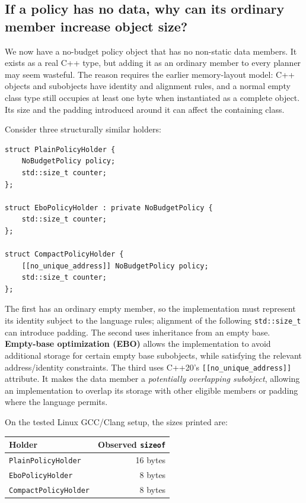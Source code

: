 \subsection{If a policy has no data, why can its ordinary member increase object size?}\label{01-foundations-i-ch005-if-a-policy-has-no-data-why-can-its-ordinary-member-increase-object-size}

We now have a no-budget policy object that has no non-static data members. It exists as a real C++ type, but adding it as an ordinary member to every planner may seem wasteful. The reason requires the earlier memory-layout model: C++ objects and subobjects have identity and alignment rules, and a normal empty class type still occupies at least one byte when instantiated as a complete object. Its size and the padding introduced around it can affect the containing class.

Consider three structurally similar holders:

\begin{verbatim}
struct PlainPolicyHolder {
    NoBudgetPolicy policy;
    std::size_t counter;
};

struct EboPolicyHolder : private NoBudgetPolicy {
    std::size_t counter;
};

struct CompactPolicyHolder {
    [[no_unique_address]] NoBudgetPolicy policy;
    std::size_t counter;
};
\end{verbatim}

The first has an ordinary empty member, so the implementation must represent its identity subject to the language rules; alignment of the following \texttt{std::size\_t} can introduce padding. The second uses inheritance from an empty base. \textbf{Empty-base optimization (EBO)} allows the implementation to avoid additional storage for certain empty base subobjects, while satisfying the relevant address/identity constraints. The third uses C++20's \texttt{{[}{[}no\_unique\_address{]}{]}} attribute. It makes the data member a \emph{potentially overlapping subobject}, allowing an implementation to overlap its storage with other eligible members or padding where the language permits.

On the tested Linux GCC/Clang setup, the sizes printed are:

{\def\LTcaptype{none} %
\begin{longtable}[]{@{}lr@{}}
\toprule\noalign{}
Holder & Observed \texttt{sizeof} \\
\midrule\noalign{}
\endhead
\bottomrule\noalign{}
\endlastfoot
\texttt{PlainPolicyHolder} & 16 bytes \\
\texttt{EboPolicyHolder} & 8 bytes \\
\texttt{CompactPolicyHolder} & 8 bytes \\
\end{longtable}
}

